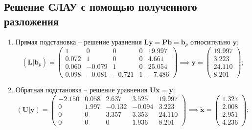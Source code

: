 \subsection{Решение СЛАУ с помощью полученного разложения}
\begin{enumerate}
    \item Прямая подстановка -- решение уравнения $\mathbf{Ly} = \mathbf{Pb}=\mathbf{b}_p$ относительно $\mathbf{y}$:
    \[ (\mathbf{L}|\mathbf{b}_p) =
    \left(
    \begin{array}{cccc|c}
        1    &      0&      0& 0& 19.997\\
        0.072&      1&      0& 0&  4.661\\
        0.060& -0.079&      1& 0& 25.054\\
        0.098& -0.081& -0.721& 1& -7.486
    \end{array}\right) \implies
    \mathbf{y} = \begin{pmatrix} 19.997 \\ 3.223 \\ 24.110 \\ 8.201 \end{pmatrix}; \]
    \item Обратная подстановка -- решение уравнения $\mathbf{U}\widetilde{\mathbf{x}} = \mathbf{y}$:
    \[ (\mathbf{U}|\mathbf{y}) =
    \left( \begin{array}{cccc|c}
       -2.150&  0.058&  2.637&  3.525& 19.997\\
        0&      1.997& -0.132& -0.094&  3.223\\
        0&      0&      3.357&  3.353& 24.110\\
        0&      0&      0&      1.936&  8.201
    \end{array} \right) \implies
    \widetilde{\mathbf{x}} = \begin{pmatrix} 1.327 \\ 2.008\\ 2.951\\ 4.236 \end{pmatrix}; \]


\end{enumerate}
